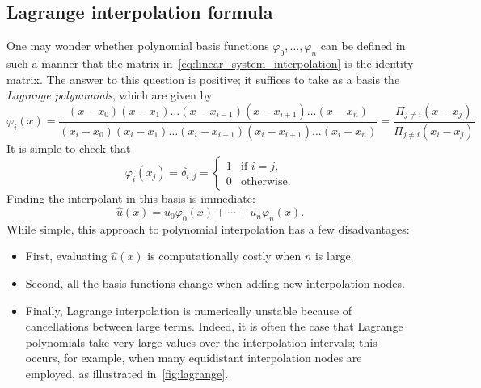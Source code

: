 \subsection{Lagrange interpolation formula}
One may wonder whether polynomial basis functions $\varphi_0, \dotsc, \varphi_n$ can be defined in such a manner that
the matrix in~\eqref{eq:linear_system_interpolation} is the identity matrix.
The answer to this question is positive;
it suffices to take as a basis the \emph{Lagrange polynomials},
which are given by
\[
    \varphi_{i}(x)
    = \frac{(x - x_0) (x - x_1) \dotsc (x - x_{i-1}) (x - x_{i+1}) \dotsc (x - x_n)}
    {(x_i - x_0) (x_i - x_1) \dotsc (x_i - x_{i-1}) (x_i - x_{i+1}) \dotsc (x_i - x_n)}
    = \frac{\Pi_{j \neq i}(x - x_j)} {\Pi_{j \neq i} (x_i - x_j)}
\]
It is simple to check that
\[
    \varphi_i(x_j) =
    \delta_{i,j} =
    \begin{cases}
        1 & \text{if $i = j$}, \\
        0 & \text{otherwise.}
    \end{cases}
\]
Finding the interpolant in this basis is immediate:
\[
    \widehat u(x) = u_0 \varphi_0(x) + \dotsb + u_n \varphi_n(x).
\]
While simple, this approach to polynomial interpolation has a few disadvantages:
\begin{itemize}
    \item
        First, evaluating $\widehat u(x)$ is computationally costly when $n$ is large.

    \item
        Second, all the basis functions change when adding new interpolation nodes.

    \item
        Finally, Lagrange interpolation is numerically unstable because of cancellations between large terms.
        Indeed, it is often the case that Lagrange polynomials take very large values over the interpolation intervals;
        this occurs, for example,
        when many equidistant interpolation nodes are employed,
        as illustrated in~\cref{fig:lagrange}.
\end{itemize}
